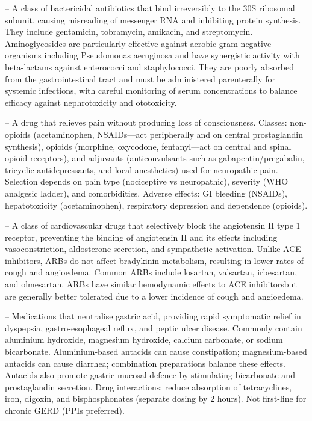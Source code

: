 -- A class of bactericidal antibiotics that bind irreversibly to the 30S ribosomal subunit, causing misreading of messenger RNA and inhibiting protein synthesis. They include gentamicin, tobramycin, amikacin, and streptomycin. Aminoglycosides are particularly effective against aerobic gram-negative organisms including Pseudomonas aeruginosa and have synergistic activity with beta-lactams against enterococci and staphylococci. They are poorly absorbed from the gastrointestinal tract and must be administered parenterally for systemic infections, with careful monitoring of serum concentrations to balance efficacy against nephrotoxicity and ototoxicity.

-- A drug that relieves pain without producing loss of consciousness. Classes: non-opioids (acetaminophen, NSAIDs—act peripherally and on central prostaglandin synthesis), opioids (morphine, oxycodone, fentanyl—act on central and spinal opioid receptors), and adjuvants (anticonvulsants such as gabapentin/pregabalin, tricyclic antidepressants, and local anesthetics) used for neuropathic pain. Selection depends on pain type (nociceptive vs neuropathic), severity (WHO analgesic ladder), and comorbidities. Adverse effects: GI bleeding (NSAIDs), hepatotoxicity (acetaminophen), respiratory depression and dependence (opioids).

-- A class of cardiovascular drugs that selectively block the angiotensin II type 1 receptor, preventing the binding of angiotensin II and its effects including vasoconstriction, aldosterone secretion, and sympathetic activation. Unlike ACE inhibitors, ARBs do not affect bradykinin metabolism, resulting in lower rates of cough and angioedema. Common ARBs include losartan, valsartan, irbesartan, and olmesartan. ARBs have similar hemodynamic effects to ACE inhibitorsbut are generally better tolerated due to a lower incidence of cough and angioedema.

-- Medications that neutralise gastric acid, providing rapid symptomatic relief in dyspepsia, gastro-esophageal reflux, and peptic ulcer disease. Commonly contain aluminium hydroxide, magnesium hydroxide, calcium carbonate, or sodium bicarbonate. Aluminium-based antacids can cause constipation; magnesium-based antacids can cause diarrhea; combination preparations balance these effects. Antacids also promote gastric mucosal defence by stimulating bicarbonate and prostaglandin secretion. Drug interactions: reduce absorption of tetracyclines, iron, digoxin, and bisphosphonates (separate dosing by 2 hours). Not first-line for chronic GERD (PPIs preferred).

